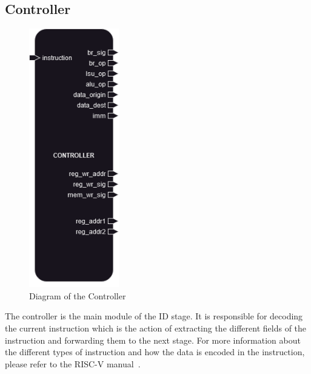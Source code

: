 \subsection{Controller}

\begin{figure}[H]
\centering
\includegraphics[width=0.35\textwidth]{../diagrams/decode/controller.png}
\caption{Diagram of the Controller}
\label{fig:controller}
\end{figure}

The controller is the main module of the ID stage. It is responsible for decoding the current instruction which is the action
of extracting the different fields of the instruction and forwarding them to the next stage. For more information about the different
types of instruction and how the data is encoded in the instruction, please refer to the RISC-V manual~\cite{riscv_manual}. \\

